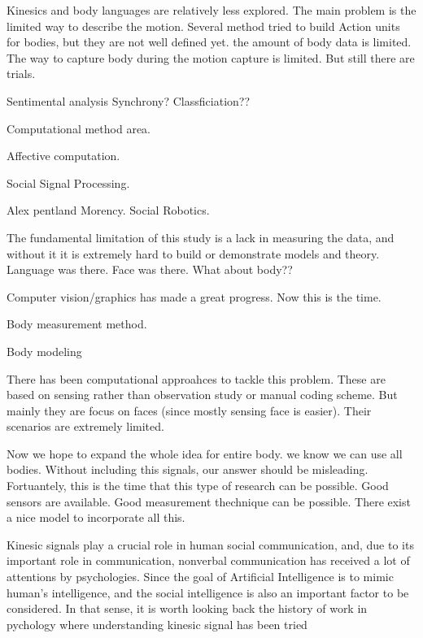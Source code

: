 Kinesics and body languages are relatively less explored. The main problem is the limited way to describe the motion. Several method tried to build Action units for bodies, but they are not well defined yet. the amount of body data is limited. The way to capture body during the motion capture is limited. But still there are trials. 

Sentimental analysis
Synchrony?
Classficiation??



Computational method area.

Affective computation. 


Social Signal Processing.


Alex pentland
Morency. 
Social Robotics.



The fundamental limitation of this study is a lack in measuring the data, and without it it is extremely hard to build or demonstrate models and theory.  
Language was there. Face was there. What about body??


Computer vision/graphics has made a great progress. Now this is the time. 


Body measurement method.

Body modeling


There has been computational approahces to tackle this problem. These are based on sensing rather than observation study or manual coding scheme.  But mainly they are focus on faces (since mostly sensing face is easier). Their scenarios are extremely limited. 
	




Now we hope to expand the whole idea for entire body. we know we can use all bodies. Without including this signals, our answer should be misleading. Fortuantely, this is the time that this type of research can be possible. Good sensors are available. Good measurement thechnique can be possible. There exist a nice model to incorporate all this.  


















Kinesic signals play a crucial role in human social communication, and, due to its important role in communication, nonverbal communication has received a lot of attentions by psychologies.  Since the goal of Artificial Intelligence is to mimic human's intelligence, and the social intelligence is also an important factor to be considered. In that sense, it is worth looking back the history of work in pychology where understanding kinesic signal has been tried 








